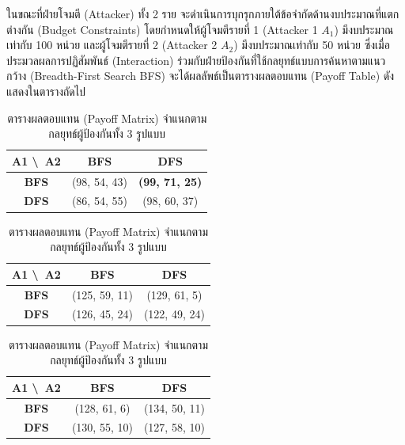 ในขณะที่ฝ่ายโจมตี (Attacker) ทั้ง 2 ราย จะดำเนินการบุกรุกภายใต้ข้อจำกัดด้านงบประมาณที่แตกต่างกัน (Budget Constraints) โดยกำหนดให้ผู้โจมตีรายที่ 1 (Attacker 1 $A_1$) มีงบประมาณเท่ากับ 100 หน่วย และผู้โจมตีรายที่ 2 (Attacker 2 $A_2$) มีงบประมาณเท่ากับ 50 หน่วย ซึ่งเมื่อประมวลผลการปฏิสัมพันธ์ (Interaction) ร่วมกับฝ่ายป้องกันที่ใช้กลยุทธ์แบบการค้นหาตามแนวกว้าง (Breadth-First Search BFS) จะได้ผลลัพธ์เป็นตารางผลตอบแทน (Payoff Table) ดังแสดงในตารางถัดไป
\begin{table}[H]
\centering
\label{taball_payoffs}

\begin{subtable}{\textwidth}
\centering
\begin{tabular}{|c|c|c|}
\hline
\textbf{A1 \textbackslash \ A2} & \textbf{BFS} & \textbf{DFS} \\ \hline
\textbf{BFS} & (98, 54, 43) & \textbf{(99, 71, 25)} \\ \hline
\textbf{DFS} & (86, 54, 55) & (98, 60, 37) \\ \hline
\end{tabular}
\end{subtable}

\vspace{0.5cm} %

\begin{subtable}{\textwidth}
\centering
\begin{tabular}{|c|c|c|}
\hline
\textbf{A1 \textbackslash \ A2} & \textbf{BFS} & \textbf{DFS} \\ \hline
\textbf{BFS} & (125, 59, 11) & (129, 61, 5) \\ \hline
\textbf{DFS} & (126, 45, 24) & (122, 49, 24) \\ \hline
\end{tabular}
\end{subtable}

\vspace{0.5cm}

\begin{subtable}{\textwidth}
\centering
\begin{tabular}{|c|c|c|}
\hline
\textbf{A1 \textbackslash \ A2} & \textbf{BFS} & \textbf{DFS} \\ \hline
\textbf{BFS} & (128, 61, 6) & (134, 50, 11) \\ \hline
\textbf{DFS} & (130, 55, 10) & (127, 58, 10) \\ \hline
\end{tabular}
\end{subtable}
\caption{ตารางผลตอบแทน (Payoff Matrix) จำแนกตามกลยุทธ์ผู้ป้องกันทั้ง 3 รูปแบบ}
\end{table}

